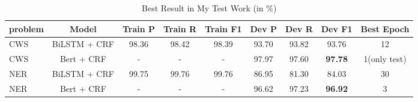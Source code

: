 \begin{table*}[htbp!]
    \centering
    \begin{tabular}{lcccccccc}
    \midrule
    problem & Model & Train P   &Train R     & Train F1       & Dev P      & Dev R & Dev F1 &Best Epoch\\
    \midrule
    CWS& BiLSTM + CRF & 98.36   & 98.42   & 98.39    & 93.70 & 93.82 &  93.76 & 12           \\
    CWS& Bert + CRF   & -       & -       & -        & 97.97 & 97.60 &  \bf97.78 & 1(only test) \\
    NER& BiLSTM + CRF & 99.75   & 99.76   & 99.76    & 86.95 & 81.30 & 84.03 & 30         \\
    NER& Bert + CRF   & -       & -       & -        & 96.62 & 97.23 & \bf96.92 & 3         \\     

    \bottomrule
    \end{tabular}
\caption{Best Result in My Test Work (in \%)}
\label{tab:batchSize}
\end{table*}
